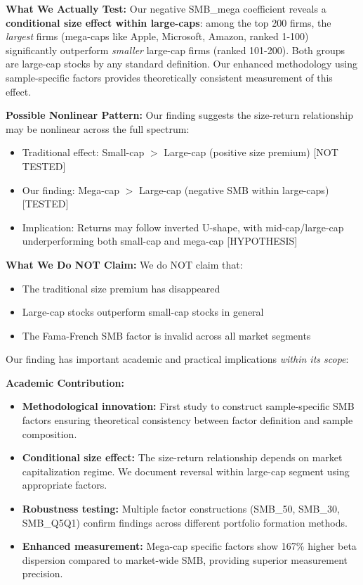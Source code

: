 \documentclass[10pt,letterpaper]{article}
\begin{document}
\textbf{What We Actually Test:} Our negative SMB\_mega coefficient reveals a \textbf{conditional size effect within large-caps}: among the top 200 firms, the \textit{largest} firms (mega-caps like Apple, Microsoft, Amazon, ranked 1-100) significantly outperform \textit{smaller} large-cap firms (ranked 101-200). Both groups are large-cap stocks by any standard definition. Our enhanced methodology using sample-specific factors provides theoretically consistent measurement of this effect.

\textbf{Possible Nonlinear Pattern:} Our finding suggests the size-return relationship may be nonlinear across the full spectrum:
\begin{itemize}
\item Traditional effect: Small-cap $>$ Large-cap (positive size premium) [NOT TESTED]
\item Our finding: Mega-cap $>$ Large-cap (negative SMB within large-caps) [TESTED]
\item Implication: Returns may follow inverted U-shape, with mid-cap/large-cap underperforming both small-cap and mega-cap [HYPOTHESIS]
\end{itemize}

\textbf{What We Do NOT Claim:} We do NOT claim that:
\begin{itemize}
\item The traditional size premium has disappeared
\item Large-cap stocks outperform small-cap stocks in general
\item The Fama-French SMB factor is invalid across all market segments
\end{itemize}

Our finding has important academic and practical implications \textit{within its scope}:

\textbf{Academic Contribution:}
\begin{itemize}
\item \textbf{Methodological innovation:} First study to construct sample-specific SMB factors ensuring theoretical consistency between factor definition and sample composition.
\item \textbf{Conditional size effect:} The size-return relationship depends on market capitalization regime. We document reversal within large-cap segment using appropriate factors.
\item \textbf{Robustness testing:} Multiple factor constructions (SMB\_50, SMB\_30, SMB\_Q5Q1) confirm findings across different portfolio formation methods.
\item \textbf{Enhanced measurement:} Mega-cap specific factors show 167\% higher beta dispersion compared to market-wide SMB, providing superior measurement precision.
\end{itemize}
\end{document}
